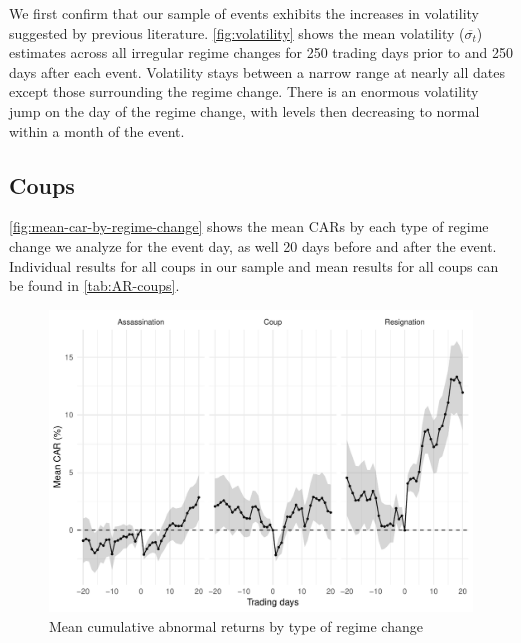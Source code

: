 \documentclass[12pt,final,fleqn]{article}
\theoremstyle{plain}
\begin{document}
We first confirm that our sample of events exhibits the increases in volatility suggested by previous literature. \autoref{fig:volatility} shows the mean volatility ($\overline{\sigma_t}$) estimates across all irregular regime changes for 250 trading days prior to and 250 days after each event. Volatility stays between a narrow range at nearly all dates except those surrounding the regime change. There is an enormous volatility jump on the day of the regime change, with levels then decreasing to normal within a month of the event.


\subsection{Coups} \label{subsec: Coups}

\autoref{fig:mean-car-by-regime-change} shows the mean CARs by each type of regime change we analyze for the event day, as well 20 days before and after the event. Individual results for all coups in our sample and mean results for all coups can be found in \autoref{tab:AR-coups}. 

\begin{figure}[!htb]
\centering
\includegraphics[scale = 0.75]{../figs/mean-car-by-regime-change-type.pdf}
\caption{Mean cumulative abnormal returns by type of regime change}\label{fig:mean-car-by-regime-change}
\end{figure}
\end{document}
